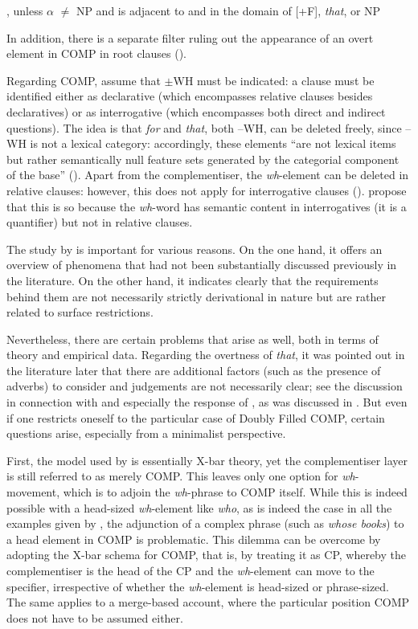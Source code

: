 , unless $\alpha$ $\neq$ NP and is adjacent to and in the domain of [+F], \textit{that}, or NP \label{thatfilter}
\z

In addition, there is a separate filter ruling out the appearance of an overt element in COMP in root clauses (\citealt[485]{chomskylasnik1977}).

Regarding COMP, \citet[444--445]{chomskylasnik1977} assume that $\pm$WH must be indicated: a clause must be identified either as declarative (which encompasses relative clauses besides declaratives) or as interrogative (which encompasses both direct and indirect questions). The idea is that \textit{for} and \textit{that}, both --WH, can be deleted freely, since --WH is not a lexical category: accordingly, these elements ``are not lexical items but rather semantically null feature sets generated by the categorial component of the base'' (\citealt[447]{chomskylasnik1977}). Apart from the complementiser, the \textit{wh}-element can be deleted in relative clauses: however, this does not apply for interrogative clauses (\citealt[447]{chomskylasnik1977}). \citet[447]{chomskylasnik1977} propose that this is so because the \textit{wh}-word has semantic content in interrogatives (it is a quantifier) but not in relative clauses.

The study by \citet{chomskylasnik1977} is important for various reasons. On the one hand, it offers an overview of phenomena that had not been substantially discussed previously in the literature. On the other hand, it indicates clearly that the requirements behind them are not necessarily strictly derivational in nature but are rather related to surface restrictions.

Nevertheless, there are certain problems that arise as well, both in terms of theory and empirical data. Regarding the overtness of \textit{that}, it was pointed out in the literature later that there are additional factors (such as the presence of adverbs) to consider and judgements are not necessarily clear; see the discussion in connection with \citet{rizzi1997} and especially the response of \citet{sobin2002}, as was discussed in . But even if one restricts oneself to the particular case of Doubly Filled COMP, certain questions arise, especially from a minimalist perspective.

First, the model used by \citet{chomskylasnik1977} is essentially X-bar theory, yet the complementiser layer is still referred to as merely COMP. This leaves only one option for \textit{wh}-movement, which is to adjoin the \textit{wh}-phrase to COMP itself. While this is indeed possible with a head-sized \textit{wh}-element like \textit{who}, as is indeed the case in all the examples given by \citet{chomskylasnik1977}, the adjunction of a complex phrase (such as \textit{whose books}) to a head element in COMP is problematic. This dilemma can be overcome by adopting the X-bar schema for COMP, that is, by treating it as CP, whereby the complementiser is the head of the CP and the \textit{wh}-element can move to the specifier, irrespective of whether the \textit{wh}-element is head-sized or phrase-sized. The same applies to a merge-based account, where the particular position COMP does not have to be assumed either.\largerpage

